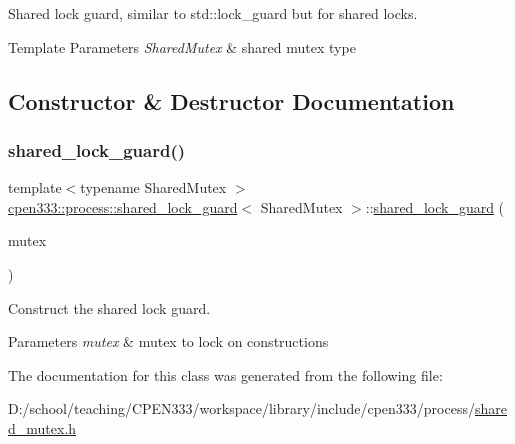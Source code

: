 Shared lock guard, similar to std\+::lock\+\_\+guard but for shared locks. 


\begin{DoxyTemplParams}{Template Parameters}
{\em Shared\+Mutex} & shared mutex type \\
\hline
\end{DoxyTemplParams}


\subsection{Constructor \& Destructor Documentation}
\mbox{\label{classcpen333_1_1process_1_1shared__lock__guard_a263fb59ac82aea8a400239ec7c238a14}} 
\subsubsection{\texorpdfstring{shared\+\_\+lock\+\_\+guard()}{shared\_lock\_guard()}}
{\footnotesize\ttfamily template$<$typename Shared\+Mutex $>$ \\
\hyperlink{classcpen333_1_1process_1_1shared__lock__guard}{cpen333\+::process\+::shared\+\_\+lock\+\_\+guard}$<$ Shared\+Mutex $>$\+::\hyperlink{classcpen333_1_1process_1_1shared__lock__guard}{shared\+\_\+lock\+\_\+guard} (\begin{DoxyParamCaption}\item[{Shared\+Mutex \&}]{mutex }\end{DoxyParamCaption})\hspace{0.3cm}{\ttfamily [inline]}}



Construct the shared lock guard. 


\begin{DoxyParams}{Parameters}
{\em mutex} & mutex to lock on constructions \\
\hline
\end{DoxyParams}


The documentation for this class was generated from the following file\+:\begin{DoxyCompactItemize}
\item 
D\+:/school/teaching/\+C\+P\+E\+N333/workspace/library/include/cpen333/process/\hyperlink{process_2shared__mutex_8h}{shared\+\_\+mutex.\+h}\end{DoxyCompactItemize}
